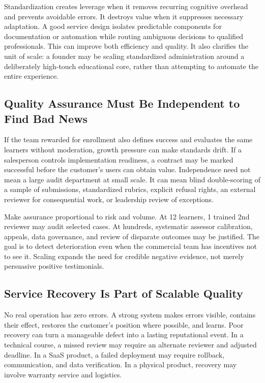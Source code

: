 Standardization creates leverage when it removes recurring cognitive overhead and prevents avoidable errors. It destroys value when it suppresses necessary adaptation. A good service design isolates predictable components for documentation or automation while routing ambiguous decisions to qualified professionals. This can improve both efficiency and quality. It also clarifies the unit of scale: a founder may be scaling standardized administration around a deliberately high-touch educational core, rather than attempting to automate the entire experience.

\subsection{Quality Assurance Must Be Independent to Find Bad News}
\label{sec:qa_independent_bad_news}

If the team rewarded for enrollment also defines success and evaluates the same learners without moderation, growth pressure can make standards drift. If a salesperson controls implementation readiness, a contract may be marked successful before the customer's users can obtain value. Independence need not mean a large audit department at small scale. It can mean blind double-scoring of a sample of submissions, standardized rubrics, explicit refusal rights, an external reviewer for consequential work, or leadership review of exceptions.

Make assurance proportional to risk and volume. At 12 learners, 1 trained 2nd reviewer may audit selected cases. At hundreds, systematic assessor calibration, appeals, data governance, and review of disparate outcomes may be justified. The goal is to detect deterioration even when the commercial team has incentives not to see it. Scaling expands the need for credible negative evidence, not merely persuasive positive testimonials.

\subsection{Service Recovery Is Part of Scalable Quality}
\label{sec:service_recovery_scalable_quality}

No real operation has zero errors. A strong system makes errors visible, contains their effect, restores the customer's position where possible, and learns. Poor recovery can turn a manageable defect into a lasting reputational event. In a technical course, a missed review may require an alternate reviewer and adjusted deadline. In a SaaS product, a failed deployment may require rollback, communication, and data verification. In a physical product, recovery may involve warranty service and logistics.


